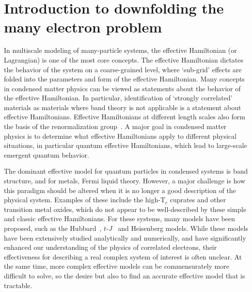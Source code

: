 \section{Introduction to downfolding the many electron problem}

In multiscale modeling of many-particle systems, the effective Hamiltonian (or Lagrangian) is one of the most core concepts. 
The effective Hamiltonian dictates the behavior of the system on a coarse-grained level, where `sub-grid' effects are folded into the parameters and form of the effective Hamiltonian. 
Many concepts in condensed matter physics can be viewed as statements about the behavior of the effective Hamiltonian. 
In particular, identification of `strongly correlated' materials as materials where band theory is not  applicable is a statement about effective Hamiltonians.
Effective Hamiltonians at different length scales also form the basis of the renormalization group~\cite{Wilson}.
A major goal in condensed matter physics is to determine what effective Hamiltonians apply to different physical situations, in particular quantum effective Hamiltonians, which lead to large-scale emergent quantum behavior. 

The dominant effective model for quantum particles in condensed systems is band structure, and for metals, Fermi liquid theory. 
However, a major challenge is how this paradigm should be altered when it is no longer a good description of the physical system.
Examples of these include the high-T$_c$ cuprates and other transition metal oxides, which do not appear to be well-described by these simple and classic  effective Hamiltonians. 
For these systems, many models have been proposed, such as the Hubbard~\cite{Hubbard1963}, $t$-$J$~\cite{tJSpalek} and Heisenberg models.
While these models have been extensively studied analytically and numerically, and have significantly enhanced our understanding of the physics of correlated electrons, their effectiveness for describing a real complex system of interest is often unclear. 
At the same time, more complex effective models can be commensurately more difficult to solve,  
so the desire but also to find an accurate effective model that is tractable. 

